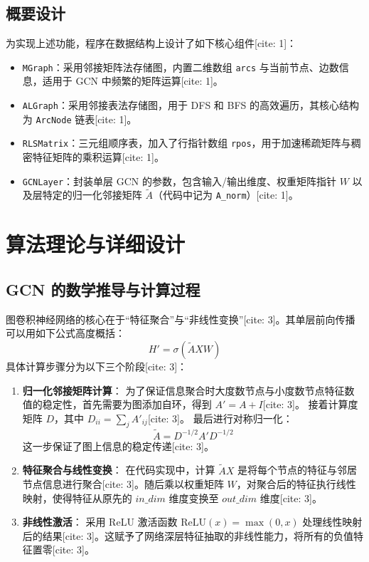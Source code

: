 \documentclass[12pt,a4paper]{article}
\begin{document}
\subsection{概要设计}
为实现上述功能，程序在数据结构上设计了如下核心组件[cite: 1]：
\begin{itemize}
    \item \texttt{MGraph}：采用邻接矩阵法存储图，内置二维数组 \texttt{arcs} 与当前节点、边数信息，适用于 GCN 中频繁的矩阵运算[cite: 1]。
    \item \texttt{ALGraph}：采用邻接表法存储图，用于 DFS 和 BFS 的高效遍历，其核心结构为 \texttt{ArcNode} 链表[cite: 1]。
    \item \texttt{RLSMatrix}：三元组顺序表，加入了行指针数组 \texttt{rpos}，用于加速稀疏矩阵与稠密特征矩阵的乘积运算[cite: 1]。
    \item \texttt{GCNLayer}：封装单层 GCN 的参数，包含输入/输出维度、权重矩阵指针 $W$ 以及层特定的归一化邻接矩阵 $\tilde{A}$（代码中记为 \texttt{A\_norm}）[cite: 1]。
\end{itemize}

\section{算法理论与详细设计}

\subsection{GCN 的数学推导与计算过程}
图卷积神经网络的核心在于“特征聚合”与“非线性变换”[cite: 3]。其单层前向传播可以用如下公式高度概括：
\[ H' = \sigma(\tilde{A}XW) \]
具体计算步骤分为以下三个阶段[cite: 3]：
\begin{enumerate}
    \item \textbf{归一化邻接矩阵计算}：
    为了保证信息聚合时大度数节点与小度数节点特征数值的稳定性，首先需要为图添加自环，得到 $A' = A + I$[cite: 3]。
    接着计算度矩阵 $D$，其中 $D_{ii} = \sum_j A'_{ij}$[cite: 3]。
    最后进行对称归一化：
    \[ \tilde{A} = D^{-1/2} A' D^{-1/2} \]
    这一步保证了图上信息的稳定传递[cite: 3]。
    
    \item \textbf{特征聚合与线性变换}：
    在代码实现中，计算 $\tilde{A}X$ 是将每个节点的特征与邻居节点信息进行聚合[cite: 3]。随后乘以权重矩阵 $W$，对聚合后的特征执行线性映射，使得特征从原先的 $in\_dim$ 维度变换至 $out\_dim$ 维度[cite: 3]。
    
    \item \textbf{非线性激活}：
    采用 ReLU 激活函数 $\text{ReLU}(x) = \max(0, x)$ 处理线性映射后的结果[cite: 3]。这赋予了网络深层特征抽取的非线性能力，将所有的负值特征置零[cite: 3]。
\end{enumerate}
\end{document}
